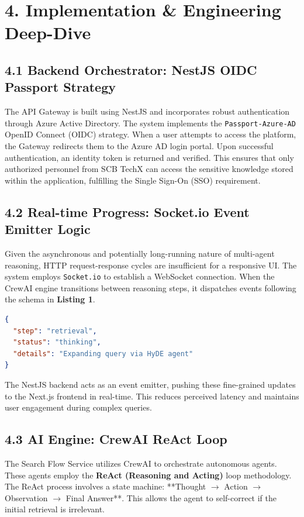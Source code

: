 \documentclass[12pt]{article}
\begin{document}
\newpage
\section{4. Implementation \& Engineering Deep-Dive}

\subsection{4.1 Backend Orchestrator: NestJS OIDC Passport Strategy}
The API Gateway is built using NestJS and incorporates robust authentication through Azure Active Directory. The system implements the \texttt{Passport-Azure-AD} OpenID Connect (OIDC) strategy. When a user attempts to access the platform, the Gateway redirects them to the Azure AD login portal. Upon successful authentication, an identity token is returned and verified. This ensures that only authorized personnel from SCB TechX can access the sensitive knowledge stored within the application, fulfilling the Single Sign-On (SSO) requirement.

\subsection{4.2 Real-time Progress: Socket.io Event Emitter Logic}
Given the asynchronous and potentially long-running nature of multi-agent reasoning, HTTP request-response cycles are insufficient for a responsive UI. The system employs \texttt{Socket.io} to establish a WebSocket connection. When the CrewAI engine transitions between reasoning steps, it dispatches events following the schema in \textbf{Listing 1}.

\begin{lstlisting}[language=json, caption=Socket.io Progress Event Schema]
{
  "step": "retrieval",
  "status": "thinking",
  "details": "Expanding query via HyDE agent"
}
\end{lstlisting}

The NestJS backend acts as an event emitter, pushing these fine-grained updates to the Next.js frontend in real-time. This reduces perceived latency and maintains user engagement during complex queries.

\subsection{4.3 AI Engine: CrewAI ReAct Loop}
The Search Flow Service utilizes CrewAI to orchestrate autonomous agents. These agents employ the \textbf{ReAct (Reasoning and Acting)} loop methodology. The ReAct process involves a state machine: **Thought $\rightarrow$ Action $\rightarrow$ Observation $\rightarrow$ Final Answer**. This allows the agent to self-correct if the initial retrieval is irrelevant.
\end{document}
